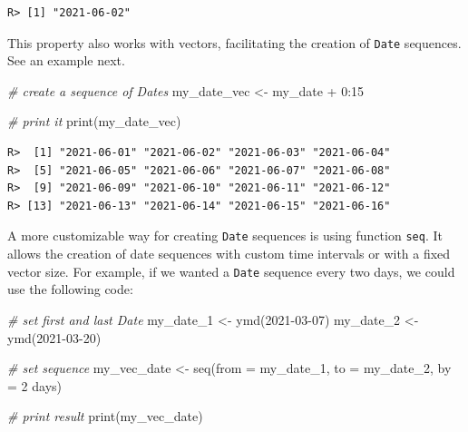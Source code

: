 \documentclass[
  12pt,
]{book}
\newenvironment{Shaded}{\begin{snugshade}}{\end{snugshade}}
\newcommand{\AttributeTok}[1]{\textcolor[rgb]{0.61,0.61,0.61}{#1}}
\newcommand{\CommentTok}[1]{\textcolor[rgb]{0.37,0.37,0.37}{\textit{#1}}}
\newcommand{\DecValTok}[1]{\textcolor[rgb]{0.06,0.06,0.06}{#1}}
\newcommand{\FunctionTok}[1]{\textcolor[rgb]{0,0,0}{#1}}
\newcommand{\NormalTok}[1]{#1}
\newcommand{\OtherTok}[1]{\textcolor[rgb]{0.37,0.37,0.37}{#1}}
\newcommand{\SpecialCharTok}[1]{\textcolor[rgb]{0,0,0}{#1}}
\newcommand{\StringTok}[1]{\textcolor[rgb]{0.5,0.5,0.5}{#1}}
\begin{document}
\begin{verbatim}
R> [1] "2021-06-02"
\end{verbatim}

This property also works with vectors, facilitating the creation of \texttt{Date} sequences. See an example next.

\begin{Shaded}
\begin{Highlighting}[]
\CommentTok{\# create a sequence of Dates}
\NormalTok{my\_date\_vec }\OtherTok{\textless{}{-}}\NormalTok{ my\_date }\SpecialCharTok{+} \DecValTok{0}\SpecialCharTok{:}\DecValTok{15}

\CommentTok{\# print it}
\FunctionTok{print}\NormalTok{(my\_date\_vec)}
\end{Highlighting}
\end{Shaded}

\begin{verbatim}
R>  [1] "2021-06-01" "2021-06-02" "2021-06-03" "2021-06-04"
R>  [5] "2021-06-05" "2021-06-06" "2021-06-07" "2021-06-08"
R>  [9] "2021-06-09" "2021-06-10" "2021-06-11" "2021-06-12"
R> [13] "2021-06-13" "2021-06-14" "2021-06-15" "2021-06-16"
\end{verbatim}

A more customizable way for creating \texttt{Date} sequences is using function \texttt{seq}. It allows the creation of date sequences with custom time intervals or with a fixed vector size. For example, if we wanted a \texttt{Date} sequence every two days, we could use the following code: 

\begin{Shaded}
\begin{Highlighting}[]
\CommentTok{\# set first and last Date}
\NormalTok{my\_date\_1 }\OtherTok{\textless{}{-}} \FunctionTok{ymd}\NormalTok{(}\StringTok{\textquotesingle{}2021{-}03{-}07\textquotesingle{}}\NormalTok{)}
\NormalTok{my\_date\_2 }\OtherTok{\textless{}{-}} \FunctionTok{ymd}\NormalTok{(}\StringTok{\textquotesingle{}2021{-}03{-}20\textquotesingle{}}\NormalTok{)}

\CommentTok{\# set sequence}
\NormalTok{my\_vec\_date }\OtherTok{\textless{}{-}} \FunctionTok{seq}\NormalTok{(}\AttributeTok{from =}\NormalTok{ my\_date\_1,}
                   \AttributeTok{to =}\NormalTok{ my\_date\_2,}
                   \AttributeTok{by =} \StringTok{\textquotesingle{}2 days\textquotesingle{}}\NormalTok{)}

\CommentTok{\# print result}
\FunctionTok{print}\NormalTok{(my\_vec\_date)}
\end{Highlighting}
\end{Shaded}
\end{document}
